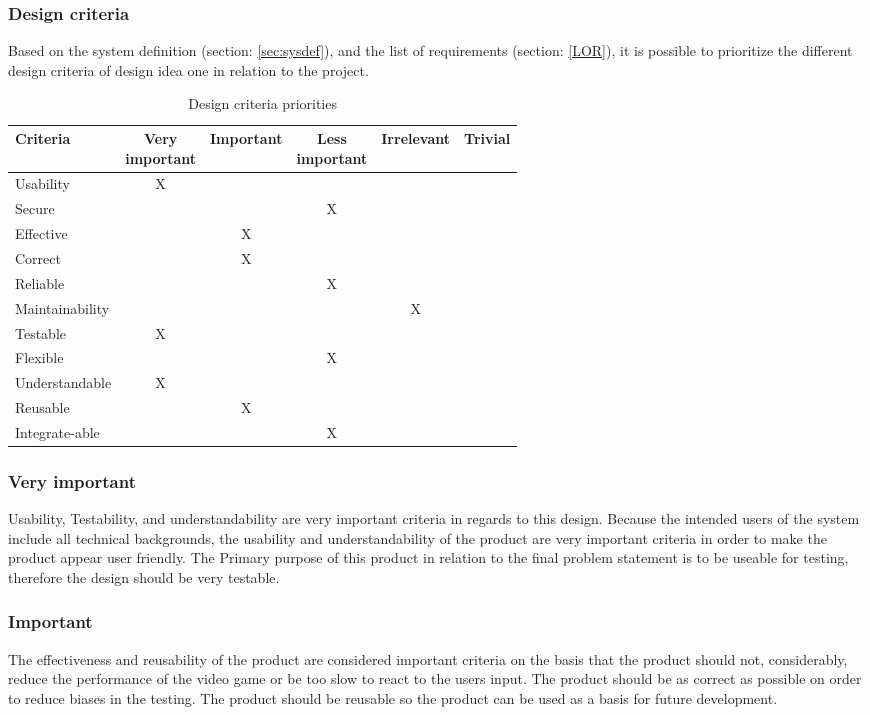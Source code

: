 \subsubsection{Design criteria}
Based on the system definition (section: \ref{sec:sysdef}), and the list of requirements (section: \ref{LOR}), it is possible to prioritize the different design criteria \parencite{Stage2001} of design idea one in relation to the project.

\begin{table}[!htbp]
\centering
\begin{tabular}{| l | c | c | c | c | c |}
\hline
Criteria & \specialcell{Very\\ important} & Important & \specialcell{Less\\ important} & Irrelevant & Trivial\\
\hline
Usability & X & & & & \\
\hline
Secure & & & X & & \\
\hline
Effective & & X & & & \\
\hline
Correct & & X & & & \\
\hline
Reliable & & & X & & \\
\hline
Maintainability & & & & X & \\
\hline
Testable & X & & & & \\
\hline
Flexible & & & X & & \\
\hline
Understandable & X & & & & \\
\hline
Reusable & & X & & & \\
\hline
Integrate-able & & & X & &\\
\hline
\end{tabular}
\caption{Design criteria priorities}\label{tab:criteria}
\end{table}

\subsubsection*{Very important}
Usability, Testability, and understandability are very important criteria in regards to this design. Because the intended users of the system include all technical backgrounds, the usability and understandability of the product are very important criteria in order to make the product appear user friendly. The Primary purpose of this product in relation to the final problem statement is to be useable for testing, therefore the design should be very testable.

\subsubsection*{Important}
The effectiveness and reusability of the product are considered important criteria on the basis that the product should not, considerably, reduce the performance of the video game or be too slow to react to the users input.  The product should be as correct as possible on order to reduce biases in the testing. The product should be reusable so the product can be used as a basis for future development.


